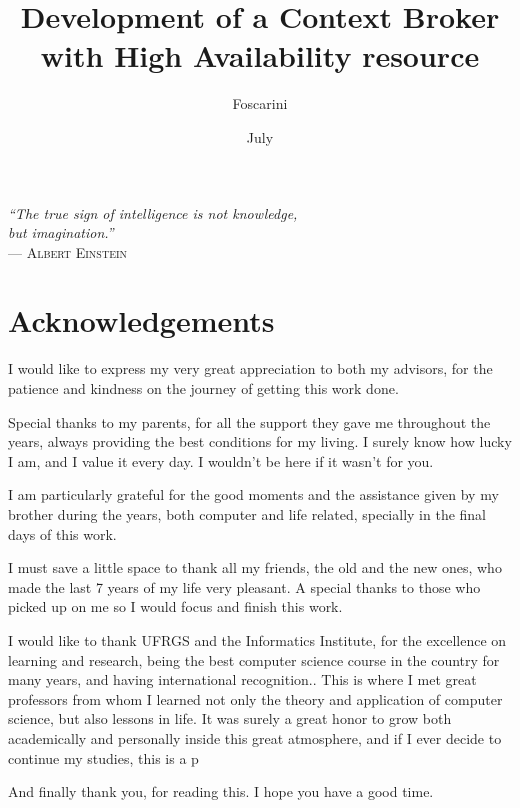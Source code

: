 \documentclass[cic,tc,english]{iiufrgs}
\title{Development of a Context Broker with High Availability resource}
\author{Foscarini}{Anderson Didoné}
\date{July}{2015}
\begin{document}
\maketitle

 \clearpage
 \begin{flushright}
     \mbox{}\vfill
     {\sffamily\itshape
       ``The true sign of intelligence is not knowledge,\\ 
       but imagination.''\\}
     --- \textsc{Albert Einstein}
 \end{flushright}

\chapter*{Acknowledgements}
I would like to express my very great appreciation to both my advisors, for the patience and kindness on the journey of getting this work done.

Special thanks to my parents, for all the support they gave me throughout the years, always providing the best conditions for my living. I surely know how lucky I am, and I value it every day. I wouldn't be here if it wasn't for you.

I am particularly grateful for the good moments and the assistance given by my brother during the years, both computer and life related, specially in the final days of this work.

I must save a little space to thank all my friends, the old and the new ones, who made the last 7 years of my life very pleasant. A special thanks to those who picked up on me so I would focus and finish this work.

I would like to thank UFRGS and the Informatics Institute, for the excellence on learning and research, being the best computer science course in the country for many years, and having international recognition.. This is where I met great professors from whom I learned not only the theory and application of computer science, but also lessons in life. It was surely a great honor to grow both academically and personally inside this great atmosphere, and if I ever decide to continue my studies, this is a p

And finally thank you, for reading this. I hope you have a good time.
\end{document}
